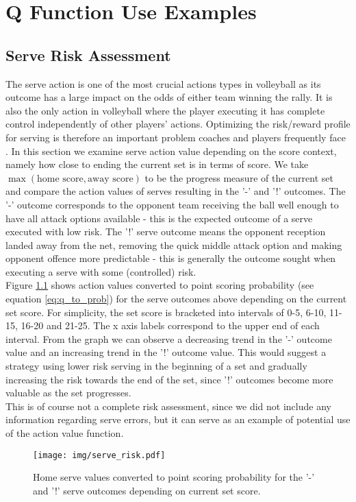 \documentclass{sfuthesis}
\begin{document}
	\chapter{Q Function Use Examples}
	\section{Serve Risk Assessment}
	The serve action is one of the most crucial actions types in volleyball as its outcome has a large impact on the odds of either team winning the rally. It is also the only action in volleyball where the player executing it has complete control independently of other players' actions. Optimizing the risk/reward profile for serving is therefore an important problem coaches and players frequently face \cite{burton2015linear}. In this section we examine serve action value depending on the score context, namely how close to ending the current set is in terms of score. We take $\max(\text{home score}, \text{away score})$ to be the progress measure of the current set and compare the action values of serves resulting in the '-' and '!' outcomes. The '-' outcome corresponds to the opponent team receiving the ball well enough to have all attack options available - this is the expected outcome of a serve executed with low risk. The '!' serve outcome means the opponent reception landed away from the net, removing the quick middle attack option and making opponent offence more predictable - this is generally the outcome sought when executing a serve with some (controlled) risk.\\
	Figure \ref{fig:serve-risk} shows action values converted to point scoring probability (see equation \eqref{eq:q_to_prob}) for the serve outcomes above depending on the current set score. For simplicity, the set score is bracketed into intervals of 0-5, 6-10, 11-15, 16-20 and 21-25. The x axis labels correspond to the upper end of each interval. From the graph we can observe a decreasing trend in the '-' outcome value and an increasing trend in the '!' outcome value. This would suggest a strategy using lower risk serving in the beginning of a set and gradually increasing the risk towards the end of the set, since '!' outcomes become more valuable as the set progresses.\\
	This is of course not a complete risk assessment, since we did not include any information regarding serve errors, but it can serve as an example of potential use of the action value function.
	
	\begin{figure}
		\centering
		\texttt{[image: img/serve\_risk.pdf]}
		\caption{Home serve values converted to point scoring probability for the '-' and '!' serve outcomes depending on current set score.}
		\label{fig:serve-risk}
	\end{figure}
	
\end{document}
